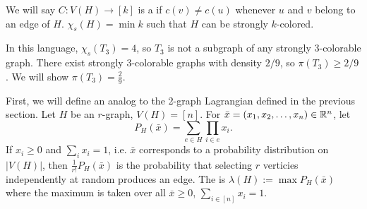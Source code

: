  We will say $C: V(H) \to [k]$ is a  if $c(v)\neq c(u)$ whenever $u$ and $v$ belong to an edge of $H$.
 $\chi_s(H) = \min k$ such that $H$ can be strongly $k$-colored.

In this language,  $\chi_s(T_3)=4$, so $T_3$ is not a subgraph of any strongly $3$-colorable graph. 
There exist strongly $3$-colorable graphs with density $2/9$, so $\pi(T_3)\geq 2/9$. We will show $\pi(T_3)=\frac{2}{9}$.

First, we will define an analog to the 2-graph Lagrangian defined in the previous section.
Let $H$ be an $r$-graph, $V(H) = [n]$. For $\bar x = (x_1,x_2,\dotsc,x_n)\in \mathbb{R}^n$, let 
\[
 P_H(\bar x) = \sum_{e\in H} \prod_{i\in e} x_i.
 \] If $x_i\geq 0$ and $\sum_i x_i = 1$, i.e. $\bar x$ corresponds to a probability distribution on $|V(H)|$, then $\frac{1}{r!}P_H(\bar x)$ is the probability that selecting $r$ verticies independently at random produces an edge. The  is $\lambda(H) := \max P_H(\bar x)$ where the maximum is taken over all $\bar x \geq 0$, $\sum_{i\in[n]}x_i = 1$.


